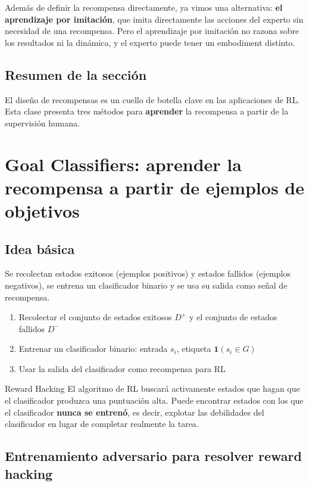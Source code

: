 \documentclass[a4paper]{article}
\begin{document}
Además de definir la recompensa directamente, ya vimos una alternativa: \textbf{el aprendizaje por imitación}, que imita directamente las acciones del experto sin necesidad de una recompensa. Pero el aprendizaje por imitación no razona sobre los resultados ni la dinámica, y el experto puede tener un embodiment distinto.

\subsection{Resumen de la sección}

El diseño de recompensas es un cuello de botella clave en las aplicaciones de RL. Esta clase presenta tres métodos para \textbf{aprender} la recompensa a partir de la supervisión humana.

\section{Goal Classifiers: aprender la recompensa a partir de ejemplos de objetivos}

\subsection{Idea básica}

Se recolectan estados exitosos (ejemplos positivos) y estados fallidos (ejemplos negativos), se entrena un clasificador binario y se usa su salida como señal de recompensa.

\begin{enumerate}
    \item Recolectar el conjunto de estados exitosos $D^+$ y el conjunto de estados fallidos $D^-$
    \item Entrenar un clasificador binario: entrada $s_i$, etiqueta $\mathbf{1}(s_i \in G)$
    \item Usar la salida del clasificador como recompensa para RL
\end{enumerate}

\begin{warningbox}{Reward Hacking}
El algoritmo de RL buscará activamente estados que hagan que el clasificador produzca una puntuación alta. Puede encontrar estados con los que el clasificador \textbf{nunca se entrenó}, es decir, explotar las debilidades del clasificador en lugar de completar realmente la tarea.
\end{warningbox}

\subsection{Entrenamiento adversario para resolver reward hacking}
\end{document}
